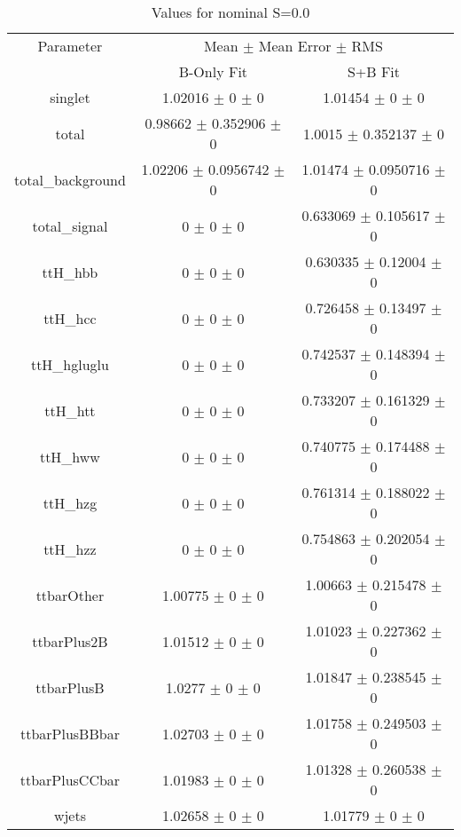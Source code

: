 \begin{table}
\centering
\caption{Values for nominal S=0.0}
\begin{tabular}{ccc}
\toprule
Parameter & \multicolumn{2}{c}{Mean $\pm$ Mean Error $\pm$ RMS}\\
 & B-Only Fit & S+B Fit\\
\midrule
singlet & \num{1.02016} $\pm$ \num{0} $\pm$ \num{0} & \num{1.01454} $\pm$ \num{0} $\pm$ \num{0}\\
total & \num{0.98662} $\pm$ \num{0.352906} $\pm$ \num{0} & \num{1.0015} $\pm$ \num{0.352137} $\pm$ \num{0}\\
total\_background & \num{1.02206} $\pm$ \num{0.0956742} $\pm$ \num{0} & \num{1.01474} $\pm$ \num{0.0950716} $\pm$ \num{0}\\
total\_signal & \num{0} $\pm$ \num{0} $\pm$ \num{0} & \num{0.633069} $\pm$ \num{0.105617} $\pm$ \num{0}\\
ttH\_hbb & \num{0} $\pm$ \num{0} $\pm$ \num{0} & \num{0.630335} $\pm$ \num{0.12004} $\pm$ \num{0}\\
ttH\_hcc & \num{0} $\pm$ \num{0} $\pm$ \num{0} & \num{0.726458} $\pm$ \num{0.13497} $\pm$ \num{0}\\
ttH\_hgluglu & \num{0} $\pm$ \num{0} $\pm$ \num{0} & \num{0.742537} $\pm$ \num{0.148394} $\pm$ \num{0}\\
ttH\_htt & \num{0} $\pm$ \num{0} $\pm$ \num{0} & \num{0.733207} $\pm$ \num{0.161329} $\pm$ \num{0}\\
ttH\_hww & \num{0} $\pm$ \num{0} $\pm$ \num{0} & \num{0.740775} $\pm$ \num{0.174488} $\pm$ \num{0}\\
ttH\_hzg & \num{0} $\pm$ \num{0} $\pm$ \num{0} & \num{0.761314} $\pm$ \num{0.188022} $\pm$ \num{0}\\
ttH\_hzz & \num{0} $\pm$ \num{0} $\pm$ \num{0} & \num{0.754863} $\pm$ \num{0.202054} $\pm$ \num{0}\\
ttbarOther & \num{1.00775} $\pm$ \num{0} $\pm$ \num{0} & \num{1.00663} $\pm$ \num{0.215478} $\pm$ \num{0}\\
ttbarPlus2B & \num{1.01512} $\pm$ \num{0} $\pm$ \num{0} & \num{1.01023} $\pm$ \num{0.227362} $\pm$ \num{0}\\
ttbarPlusB & \num{1.0277} $\pm$ \num{0} $\pm$ \num{0} & \num{1.01847} $\pm$ \num{0.238545} $\pm$ \num{0}\\
ttbarPlusBBbar & \num{1.02703} $\pm$ \num{0} $\pm$ \num{0} & \num{1.01758} $\pm$ \num{0.249503} $\pm$ \num{0}\\
ttbarPlusCCbar & \num{1.01983} $\pm$ \num{0} $\pm$ \num{0} & \num{1.01328} $\pm$ \num{0.260538} $\pm$ \num{0}\\
wjets & \num{1.02658} $\pm$ \num{0} $\pm$ \num{0} & \num{1.01779} $\pm$ \num{0} $\pm$ \num{0}\\
\bottomrule
\end{tabular}
\end{table}